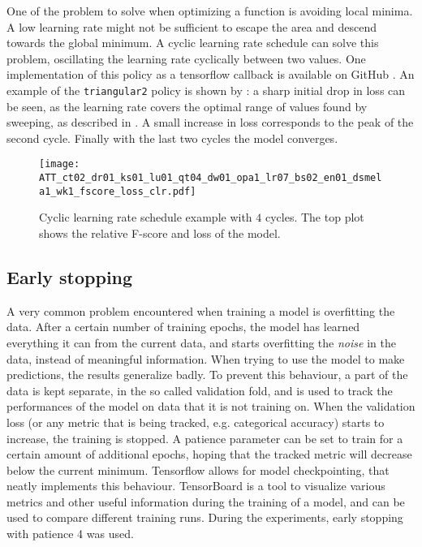 One of the problem to solve when optimizing a function is avoiding local minima.
A low learning rate might not be sufficient to escape the area and descend
towards the global minimum.
A cyclic learning rate schedule \cite{smith2017cyclical} can solve this problem,
oscillating the learning rate cyclically between two values.
One implementation of this policy as a tensorflow callback is available on
GitHub \cite{bckenstlerCLR}.
An example of the \texttt{triangular2} policy is shown by
: a sharp initial drop in loss can be seen, as the
learning rate covers the optimal range of values found by sweeping, as
described in . A small increase in loss corresponds to the
peak of the second cycle. Finally with the last two cycles the model converges.

\begin{figure}[t!]
    \centering
    \texttt{[image: ATT\_ct02\_dr01\_ks01\_lu01\_qt04\_dw01\_opa1\_lr07\_bs02\_en01\_dsmela1\_wk1\_fscore\_loss\_clr.pdf]}
    \caption{Cyclic learning rate schedule example with $4$ cycles.
    The top plot shows the relative F-score and loss of the model.}%
    \label{fig:cyclic_lr_example}
\end{figure}


\subsection{Early stopping}

A very common problem encountered when training a model is overfitting the
data. After a certain number of training epochs, the model has learned
everything it can from the current data, and starts overfitting the
\textit{noise} in the data, instead of meaningful information.
When trying to use the model to make predictions, the results generalize badly.
To prevent this behaviour, a part of the data is kept separate, in the so
called validation fold, and is used to track the performances of the model on
data that it is not training on.
When the validation loss (or any metric that is being tracked, e.g. categorical
accuracy) starts to increase, the training is stopped.
A patience parameter can be set to train for a certain amount of additional
epochs, hoping that the tracked metric will decrease below the current minimum.
Tensorflow allows for model checkpointing, that neatly implements this
behaviour.
TensorBoard is a tool to visualize various metrics and other useful information
during the training of a model, and can be used to compare different training
runs.
During the experiments, early stopping with patience 4 was used.

